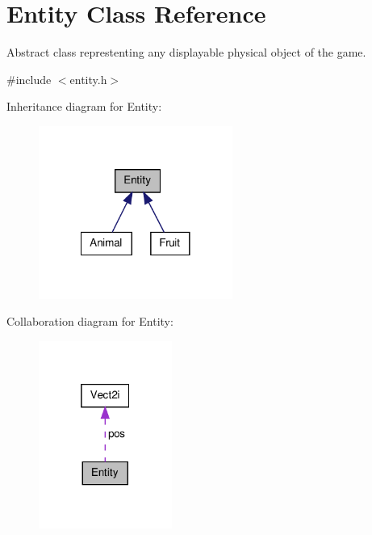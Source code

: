 \hypertarget{class_entity}{\section{Entity Class Reference}
\label{class_entity}
}


Abstract class represtenting any displayable physical object of the game.  




{\ttfamily \#include $<$entity.\-h$>$}



Inheritance diagram for Entity\-:
\nopagebreak
\begin{figure}[H]
\begin{center}
\leavevmode
\includegraphics[width=180pt]{class_entity__inherit__graph}
\end{center}
\end{figure}


Collaboration diagram for Entity\-:
\nopagebreak
\begin{figure}[H]
\begin{center}
\leavevmode
\includegraphics[width=124pt]{class_entity__coll__graph}
\end{center}
\end{figure}
